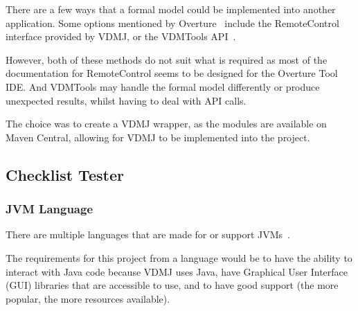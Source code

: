 \documentclass[../dissertation.tex]{subfiles}
\begin{document}
There are a few ways that a formal model could be implemented into another application.
Some options mentioned by Overture~\cite{overture-remote} include the RemoteControl interface
provided by VDMJ, or the VDMTools API~\cite{vdmtoolbox-api}.

However, both of these methods do not suit what is required as most of the documentation
for RemoteControl seems to be designed for the Overture Tool IDE. And VDMTools
may handle the formal model differently or produce unexpected results, whilst having to deal
with API calls.

The choice was to create a VDMJ wrapper, as the modules are available on Maven Central,
allowing for VDMJ to be implemented into the project.

\subsection{Checklist Tester}
\subsubsection{JVM Language}


There are multiple languages that are made for or support JVMs~\cite{jvm-alt-lang}.

The requirements for this project from a language would be to have the ability to interact
with Java code because VDMJ uses Java, have Graphical User Interface (GUI) libraries that
are accessible to use, and to have good support (the more popular, the more resources available).
\end{document}
